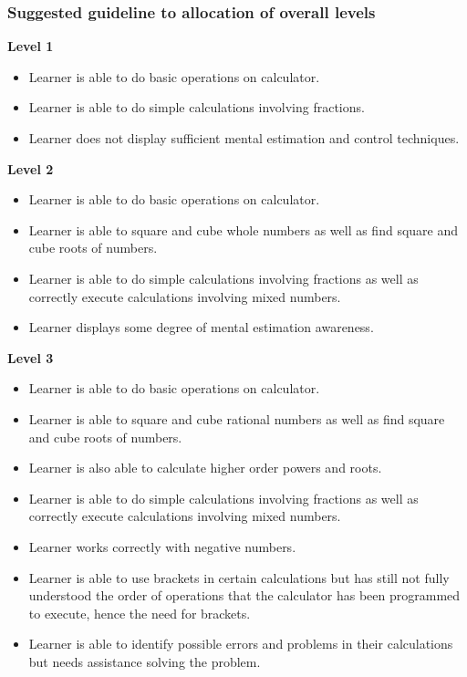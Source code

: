 \subsubsection{Suggested guideline to allocation of overall levels}
\textbf{Level 1}
\begin{itemize}[noitemsep]
\item Learner is able to do basic operations on calculator.
\item Learner is able to do simple calculations involving fractions.
\item Learner does not display sufficient mental estimation and control techniques.
\end{itemize}
\textbf{Level 2}\begin{itemize}[noitemsep]
\item Learner is able to do basic operations on calculator.
\item Learner is able to square and cube whole numbers as well as find square and cube roots of numbers.
\item Learner is able to do simple calculations involving fractions as well as correctly execute calculations involving mixed numbers.
\item Learner displays some degree of mental estimation awareness.
\end{itemize}
\textbf{Level 3}\begin{itemize}[noitemsep]
\item Learner is able to do basic operations on calculator.
\item Learner is able to square and cube rational numbers as well as find square and cube roots of numbers.
\item Learner is also able to calculate higher order powers and roots.
\item Learner is able to do simple calculations involving fractions as well as correctly execute calculations involving mixed numbers.
\item Learner works correctly with negative numbers.
\item Learner is able to use brackets in certain calculations but has still not fully understood the order of operations that the calculator has been programmed to execute, hence the need for brackets.
\item Learner is able to identify possible errors and problems in their calculations but needs assistance solving the problem.
\end{itemize}
